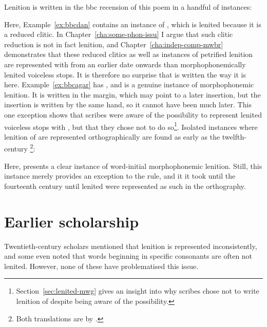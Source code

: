 Lenition is written in the \gls{bbc} recension of this poem in a handful of instances:
\begin{mwl}
\end{mwl}
Here, Example~\ref{ex:bbcdan} contains an instance of , which is lenited because it is a reduced clitic. In Chapter~\ref{cha:some-phon-issu} I argue that such clitic reduction is not in fact lenition, and Chapter~\ref{cha:indep-comp-mwbr} demonstrates that these reduced clitics as well as instances of petrified lenition are represented with  from an earlier date onwards than morphophonemically lenited voiceless stops. It is therefore no surprise that  is written the way it is here. Example~\ref{ex:bbcagar} has , and is a genuine instance of morphophonemic lenition. It is written in the margin, which may point to a later insertion, but the insertion is written by the same hand, so it cannot have been much later. This one exception shows that scribes were aware of the possibility to represent lenited voiceless stops with , but that they chose not to do so\footnote{Section~\ref{sec:lenited-mwg} gives an insight into why scribes chose not to write lenition of  despite being aware of the possibility.}. Isolated instances where lenition of  are represented orthographically are found as early as the twelfth-century \footnote{Both translations are by \textcite[136]{davies_braint_1974}.}:
\begin{mwl}
\end{mwl}
Here,   presents a clear instance of word-initial morphophonemic lenition. Still, this instance merely  provides an exception to the rule, and it it took until the fourteenth century until lenited  were represented as such in the orthography.

\section{Earlier scholarship}
\label{sec:earlier-literature}
Twentieth-century scholars mentioned that lenition is represented inconsistently, and some even noted that words beginning in specific consonants are often not lenited. However, none of these have problematised this issue.

